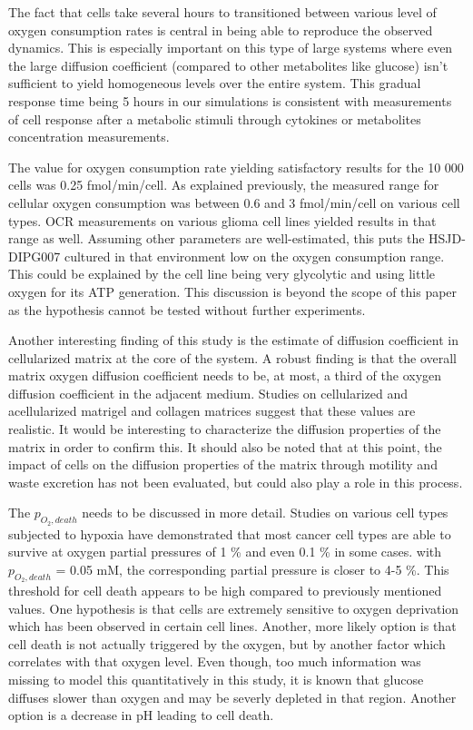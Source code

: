 \documentclass[11pt,a4paper]{article}
\begin{document}
% 
The fact that cells take several hours to transitioned between various level of oxygen consumption rates is central in being able to reproduce the observed dynamics. This is especially important on this type of large systems where even the large diffusion coefficient (compared to other metabolites like glucose) isn't sufficient to yield homogeneous levels over the entire system. This gradual response time being 5 hours in our simulations is consistent with measurements of cell response after a metabolic stimuli through cytokines or metabolites concentration measurements.\cite{Simoes2015}\cite{Puschel2020}

The value for oxygen consumption rate yielding satisfactory results for the 10 000 cells was 0.25 fmol/min/cell. As explained previously, the measured range for cellular oxygen consumption was between  0.6 and 3 fmol/min/cell on various cell types.\cite{Wagner2011} OCR measurements on various glioma cell lines yielded results in that range as well.\cite{Ruas2018}\cite{Shen2024}\cite{Shen2020}\cite{Mbah2022} Assuming other parameters are well-estimated, this puts the HSJD-DIPG007 cultured in that environment low on the oxygen consumption range. This could be explained by the cell line being very glycolytic and using little oxygen for its ATP generation. This discussion is beyond the scope of this paper as the hypothesis cannot be tested without further experiments.

Another interesting finding of this study is the estimate of diffusion coefficient in cellularized matrix at the core of the system. A robust finding is that the overall matrix oxygen diffusion coefficient needs to be, at most, a third of the oxygen diffusion coefficient in the adjacent medium. Studies on cellularized and acellularized matrigel and collagen matrices suggest that these values are realistic.\cite{Colom2014} It would be interesting to characterize the diffusion properties of the matrix in order to confirm this. It should also be noted that at this point, the impact of cells on the diffusion properties of the matrix through motility and waste excretion has not been evaluated, but could also play a role in this process.

The $p_{O_2,death}$ needs to be discussed in more detail. Studies on various cell types subjected to hypoxia have demonstrated that most cancer cell types are able to survive at oxygen partial pressures of 1 \% and even 0.1 \% in some cases.\cite{McKeown2014}\cite{Nisar2023}\cite{Cunha2019}\cite{Liu2022} with  $p_{O_2,death}$ = 0.05 mM, the corresponding partial pressure is closer to 4-5 \%. This threshold for cell death appears to be high compared to previously mentioned values. One hypothesis is that cells are extremely sensitive to oxygen deprivation which has been observed in certain cell lines.\cite{Griguer2005} Another, more likely option is that cell death is not actually triggered by the oxygen, but by another factor which correlates with that oxygen level. Even though, too much information was missing to model this quantitatively in this study, it is known that glucose diffuses slower than oxygen and may be severly depleted in that region. Another option is a decrease in pH leading to cell death.
\end{document}
